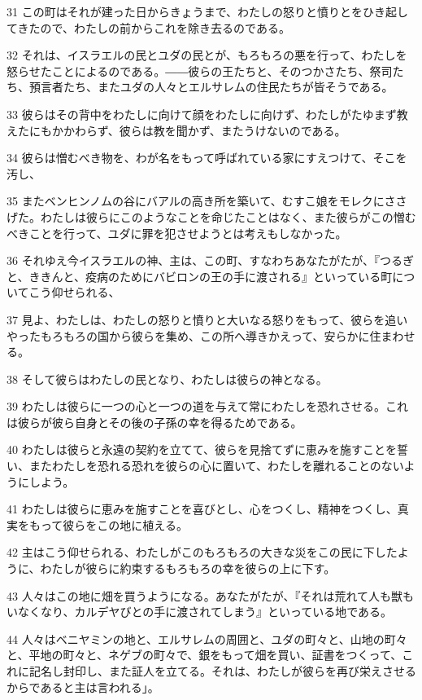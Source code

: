 \par 31 この町はそれが建った日からきょうまで、わたしの怒りと憤りとをひき起してきたので、わたしの前からこれを除き去るのである。
\par 32 それは、イスラエルの民とユダの民とが、もろもろの悪を行って、わたしを怒らせたことによるのである。――彼らの王たちと、そのつかさたち、祭司たち、預言者たち、またユダの人々とエルサレムの住民たちが皆そうである。
\par 33 彼らはその背中をわたしに向けて顔をわたしに向けず、わたしがたゆまず教えたにもかかわらず、彼らは教を聞かず、またうけないのである。
\par 34 彼らは憎むべき物を、わが名をもって呼ばれている家にすえつけて、そこを汚し、
\par 35 またベンヒンノムの谷にバアルの高き所を築いて、むすこ娘をモレクにささげた。わたしは彼らにこのようなことを命じたことはなく、また彼らがこの憎むべきことを行って、ユダに罪を犯させようとは考えもしなかった。
\par 36 それゆえ今イスラエルの神、主は、この町、すなわちあなたがたが、『つるぎと、ききんと、疫病のためにバビロンの王の手に渡される』といっている町についてこう仰せられる、
\par 37 見よ、わたしは、わたしの怒りと憤りと大いなる怒りをもって、彼らを追いやったもろもろの国から彼らを集め、この所へ導きかえって、安らかに住まわせる。
\par 38 そして彼らはわたしの民となり、わたしは彼らの神となる。
\par 39 わたしは彼らに一つの心と一つの道を与えて常にわたしを恐れさせる。これは彼らが彼ら自身とその後の子孫の幸を得るためである。
\par 40 わたしは彼らと永遠の契約を立てて、彼らを見捨てずに恵みを施すことを誓い、またわたしを恐れる恐れを彼らの心に置いて、わたしを離れることのないようにしよう。
\par 41 わたしは彼らに恵みを施すことを喜びとし、心をつくし、精神をつくし、真実をもって彼らをこの地に植える。
\par 42 主はこう仰せられる、わたしがこのもろもろの大きな災をこの民に下したように、わたしが彼らに約束するもろもろの幸を彼らの上に下す。
\par 43 人々はこの地に畑を買うようになる。あなたがたが、『それは荒れて人も獣もいなくなり、カルデヤびとの手に渡されてしまう』といっている地である。
\par 44 人々はベニヤミンの地と、エルサレムの周囲と、ユダの町々と、山地の町々と、平地の町々と、ネゲブの町々で、銀をもって畑を買い、証書をつくって、これに記名し封印し、また証人を立てる。それは、わたしが彼らを再び栄えさせるからであると主は言われる」。

